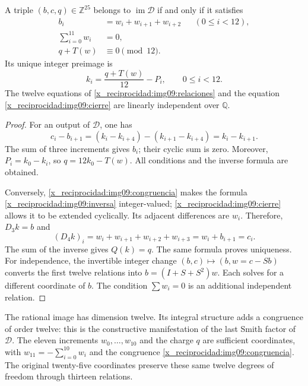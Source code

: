 \begin{theorem}
\label{x_reciprocidad:img09:imagen}
A triple $(b,c,q)\in\mathbb Z^{25}$ belongs to
$\operatorname{im}\mathcal D$ if and only if it satisfies
\begin{align}
 b_i&=w_i+w_{i+1}+w_{i+2}&& (0\leq i<12),
 \label{x_reciprocidad:img09:relaciones}\\
 \sum_{i=0}^{11}w_i&=0,
 \label{x_reciprocidad:img09:cierre}\\
 q+T(w)&\equiv0\pmod {12}.
 \label{x_reciprocidad:img09:congruencia}
\end{align}
Its unique integer preimage is
\begin{equation}
 k_i=\frac{q+T(w)}{12}-P_i,\qquad0\leq i<12.
 \label{x_reciprocidad:img09:inversa}
\end{equation}
The twelve equations of \eqref{x_reciprocidad:img09:relaciones} and the equation \eqref{x_reciprocidad:img09:cierre} are linearly independent over $\mathbb Q$.
\end{theorem}
\begin{proof}
For an output of $\mathcal D$, one has
\[
 c_i-b_{i+1}=(k_i-k_{i+4})-(k_{i+1}-k_{i+4})=k_i-k_{i+1}.
\]
The sum of three increments gives $b_i$; their cyclic sum is zero. Moreover, $P_i=k_0-k_i$, so $q=12k_0-T(w)$. All conditions and the inverse formula are obtained.

Conversely, \eqref{x_reciprocidad:img09:congruencia} makes the formula \eqref{x_reciprocidad:img09:inversa} integer-valued; \eqref{x_reciprocidad:img09:cierre} allows it to be extended cyclically. Its adjacent differences are $w_i$. Therefore, $D_3k=b$ and
\[
 (D_4k)_i=w_i+w_{i+1}+w_{i+2}+w_{i+3}
 =w_i+b_{i+1}=c_i.
\]
The sum of the inverse gives $Q(k)=q$. The same formula proves uniqueness. For independence, the invertible integer change $(b,c)\mapsto(b,w=c-Sb)$ converts the first twelve relations into $b=(I+S+S^2)w$. Each solves for a different coordinate of $b$. The condition $\sum w_i=0$ is an additional independent relation.
\end{proof}

The rational image has dimension twelve. Its integral structure adds a congruence of order twelve: this is the constructive manifestation of the last Smith factor of $\mathcal D$. The eleven increments $w_0,\ldots,w_{10}$ and the charge $q$ are sufficient coordinates, with $w_{11}=-\sum_{i=0}^{10}w_i$ and the congruence \eqref{x_reciprocidad:img09:congruencia}. The original twenty-five coordinates preserve these same twelve degrees of freedom through thirteen relations.

